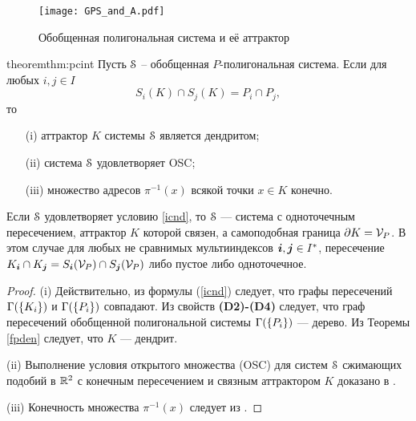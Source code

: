 \begin{figure}[H]
    \centering
    \texttt{[image: GPS\_and\_A.pdf]}
    \caption{Обобщенная полигональная система и её аттрактор}
    \label{img:ops}
\end{figure}
\begin{restatethis}{theorem}{thm:pcint}\label{thm:pcint}
Пусть ${\EuScript S}$ --  обобщенная $P$-полигональная система.  
Если для любых $i, j \in I$ 
\begin{equation}\label{icnd}
S_i(K)\cap S_j(K)=P_i\cap P_j,
\end{equation} 
то 
\begin{itemize}[nolistsep]
    \item[(i)] аттрактор $K$ системы ${\EuScript S}$ является дендритом;
    \item[(ii)] система ${\EuScript S}$ удовлетворяет OSC;
    \item[(iii)] множество адресов $\pi^{-1}(x)$ всякой точки $x\in K$ конечно.
\end{itemize}
   
\end{restatethis}


\begin{remark}\label{fpro} 
Если ${\EuScript S}$ удовлетворяет условию \eqref{icnd}, то ${\EuScript S}$ --- система с одноточечным пересечением, аттрактор $K$ которой связен, а самоподобная граница $\partial K={\mathcal V}_P$. 
В этом случае для любых не сравнимых мультииндексов ${\bm{i}},{\bm{j}}\in I^*$, пересечение $K_{\bm{i}}\cap K_{\bm{j}}=S_{\bm{i}}({\mathcal V}_P)\cap S_{\bm{j}}({\mathcal V}_P)$ либо пустое либо одноточечное.
\end{remark}

\begin{proof}
(i) Действительно, из формулы (\ref{icnd}) следует, что графы пересечений $\Gamma(\{K_i\})$ и $\Gamma(\{P_i\})$ совпадают. 
Из свойств {\bf (D2)-(D4)} следует, что граф пересечений обобщенной полигональной системы  $\Gamma(\{P_i\})$ --- дерево. 
Из Теоремы \ref{fpden} следует, что $K$ --- дендрит.

(ii) Выполнение условия открытого множества (OSC) для систем ${\EuScript S}$ сжимающих подобий в $\mathbb{R}^2$ с конечным пересечением и связным аттрактором $K$ доказано в \cite{BR}.

(iii) Конечность множества $\pi^{-1}(x)$ следует из \cite[Proposition 2.3]{FPS}.
\end{proof}




